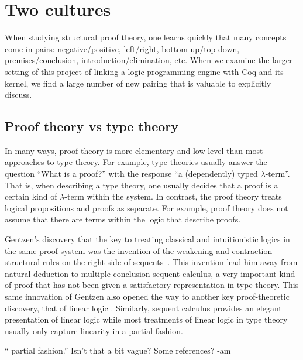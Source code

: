 \section{Two cultures}

When studying structural proof theory, one learns quickly that many
concepts come in pairs: negative/positive, left/right,
bottom-up/top-down, premises/conclusion, introduction/elimination,
etc.  When we examine the larger setting of this project of linking a
logic programming engine with Coq and its kernel, we find a large
number of new pairing that is valuable to explicitly discuss.

\subsection{Proof theory vs type theory}

In many ways, proof theory is more elementary and low-level than most
approaches to type theory.  For example, type theories usually answer
the question ``What is a proof?'' with the response ``a (dependently)
typed $\lambda$-term''.  That is, when describing a type theory, one
usually decides that a proof is a certain kind of $\lambda$-term
within the system.  In contrast, the proof theory treats logical
propositions and proofs as separate.  For example, proof theory does
not assume that there are terms within the logic that describe proofs.



Gentzen's discovery that the key to treating classical and
intuitionistic logics in the same proof system was the invention of
the weakening and contraction structural rules on the right-side of
sequents~\cite{gentzen35}.  This invention lead him away from natural
deduction to multiple-conclusion sequent calculus, a very important
kind of proof that has not been given a satisfactory representation in
type theory.  This same innovation of Gentzen also opened the way to
another key proof-theoretic discovery, that of linear logic
\cite{girard87tcs}.  Similarly, sequent calculus provides an elegant
presentation of linear logic while most treatments of linear logic in
type theory usually only capture linearity in a partial fashion.
\begin{metanote}
  `` partial fashion.'' Isn't that a bit vague? Some references? -am
\end{metanote}

